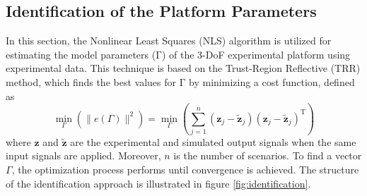 \documentclass[peerreview]{IEEEtran}
\begin{document}
\subsection{Identification of the Platform Parameters}
\noindent In this section, the Nonlinear Least Squares (NLS) algorithm is utilized for estimating the model parameters ($\boldsymbol{\mathrm{\Gamma}}$) of the 3-DoF experimental platform using experimental data.
This technique is based on the Trust-Region Reflective (TRR) method, which finds the best values for $\boldsymbol{\mathrm{\Gamma}}$ by minimizing a cost function, defined as
\begin{equation}
	\min_{\Gamma}\left(\parallel e(\Gamma) \parallel^2\right) = 
	\min_{\Gamma} \left(\sum_{j=1}^{n}(\boldsymbol{z}_j- \tilde{\boldsymbol{z}}_j)(\boldsymbol{z}_j- \tilde{\boldsymbol{z}}_j)^\mathrm{T}\right)
\end{equation} %
where $\boldsymbol{z}$ and $\tilde{\boldsymbol{z}}$ are the experimental and simulated output signals when the same input signals are applied.
Moreover, $n$ is the number of scenarios.
To find a vector $\Gamma$, the optimization process performs until convergence is achieved. %
The structure of the identification approach is illustrated in figure \ref{fig:identification}.
\end{document}
